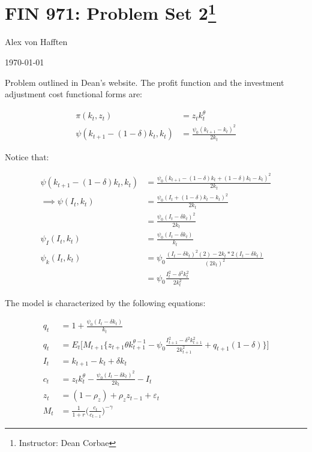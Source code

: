\documentclass{article}
\begin{document}
\section*{FIN 971: Problem Set 2\footnote{Instructor: Dean Corbae}}

Alex von Hafften

\today

\bigskip

Problem outlined in Dean's website.  The profit function and the investment adjustment cost functional forms are:

\begin{align*}
\pi(k_t, z_t) &= z_t k_t^{\theta} \\
\psi(k_{t+1} - (1 -\delta)k_t, k_t) &= \frac{\psi_0 (k_{t+1} - k_t)^2}{2k_t}
\end{align*}

Notice that:

\begin{align*}
\psi(k_{t+1} - (1 -\delta)k_t, k_t) &= \frac{\psi_0 (k_{t+1} - (1 -\delta)k_t + (1 -\delta)k_t - k_t)^2}{2k_t} \\
\implies
\psi(I_t, k_t) 
&= \frac{\psi_0 (I_t + (1 -\delta)k_t - k_t)^2}{2k_t} \\
&= \frac{\psi_0 (I_t -\delta k_t)^2}{2k_t} \\
\psi_I(I_t, k_t) &= \frac{\psi_0 (I_t -\delta k_t)}{k_t} \\
\psi_k(I_t, k_t) &= \psi_0\frac{(I_t - \delta k_t)^2(2) - 2k_t * 2(I_t - \delta k_t)}{(2k_t)^2} \\
&= \psi_0 \frac{I_t^2 - \delta^2 k_t^2}{2k_t^2}
\end{align*}

The model is characterized by the following equations:

\begin{align*}
q_t &= 1 + \frac{\psi_0 (I_t -\delta k_t)}{k_t} \\
q_t &= E_t \Bigg[M_{t+1} \Bigg\{ z_{t+1}\theta k_{t+1}^{\theta - 1}- \psi_0 \frac{I_{t+1}^2 - \delta^2 k_{t+1}^2}{2k_{t+1}^2} + q_{t+1} ( 1 -\delta)\Bigg\} \Bigg] \\
I_t &= k_{t+1} - k_t + \delta k_t \\
c_t &= z_t k_t^{\theta} - \frac{\psi_0 (I_t -\delta k_t)^2}{2k_t} - I_t \\
z_t &= (1 - \rho_z) + \rho_z z_{t-1} + \varepsilon_t \\
M_t &= \frac{1}{1 +r} \Bigg(\frac{c_t}{c_{t-1}}\Bigg)^{-\gamma}
\end{align*}
\end{document}
